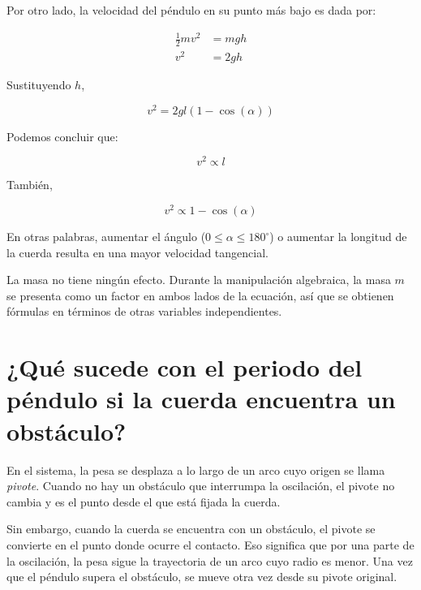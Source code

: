 \documentclass[letterpaper]{report}
\numberwithin{table}{section}
\begin{document}
Por otro lado, la velocidad del péndulo en su punto más bajo es dada por:

\begin{align}
  \frac{1}{2}m v^{2} &= mgh \\
  v^{2} &= 2gh
\end{align}

Sustituyendo $h$,

\begin{equation}
  v^{2} = 2gl(1 - \cos(\alpha))
\end{equation}

Podemos concluir que:

\begin{equation}
  v^{2} \propto l
\end{equation}

También,

\begin{equation}
  v^{2} \propto 1 - \cos(\alpha)
\end{equation}

En otras palabras, aumentar el ángulo ($0 \leq \alpha \leq
180^{\circ}$) o aumentar la longitud de la cuerda resulta en una
mayor velocidad tangencial.

La masa no tiene ningún efecto. Durante la manipulación algebraica,
la masa $m$ se presenta como un factor en ambos lados de la ecuación,
así que se obtienen fórmulas en términos de otras variables independientes.

\section*{¿Qué sucede con el periodo del péndulo si la cuerda
encuentra un obstáculo?}

En el sistema, la pesa se desplaza a lo largo de un arco cuyo origen
se llama \emph{pivote}. Cuando no hay un obstáculo que interrumpa la
oscilación, el pivote no cambia y es el punto desde el que está
fijada la cuerda.

Sin embargo, cuando la cuerda se encuentra con un obstáculo, el
pivote se convierte en el punto donde ocurre el contacto. Eso
significa que por una parte de la oscilación, la pesa sigue la
trayectoria de un arco cuyo radio es menor. Una vez que el péndulo
supera el obstáculo, se mueve otra vez desde su pivote original.
\end{document}
